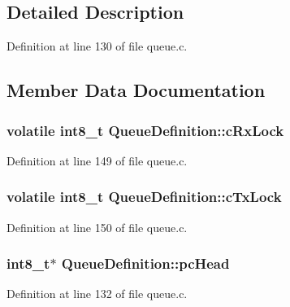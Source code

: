 \subsection{Detailed Description}


Definition at line 130 of file queue.\+c.



\subsection{Member Data Documentation}
\subsubsection[{\texorpdfstring{c\+Rx\+Lock}{cRxLock}}]{\setlength{\rightskip}{0pt plus 5cm}volatile int8\+\_\+t Queue\+Definition\+::c\+Rx\+Lock}\hypertarget{struct_queue_definition_ac750a3f75a6e174adbc697e473a0dd13}{}\label{struct_queue_definition_ac750a3f75a6e174adbc697e473a0dd13}


Definition at line 149 of file queue.\+c.

\subsubsection[{\texorpdfstring{c\+Tx\+Lock}{cTxLock}}]{\setlength{\rightskip}{0pt plus 5cm}volatile int8\+\_\+t Queue\+Definition\+::c\+Tx\+Lock}\hypertarget{struct_queue_definition_a24ac3f0707f098da2a22244d843fcf82}{}\label{struct_queue_definition_a24ac3f0707f098da2a22244d843fcf82}


Definition at line 150 of file queue.\+c.

\subsubsection[{\texorpdfstring{pc\+Head}{pcHead}}]{\setlength{\rightskip}{0pt plus 5cm}int8\+\_\+t$\ast$ Queue\+Definition\+::pc\+Head}\hypertarget{struct_queue_definition_a487dc7e43b380c58212cba72bc33e0ed}{}\label{struct_queue_definition_a487dc7e43b380c58212cba72bc33e0ed}


Definition at line 132 of file queue.\+c.


